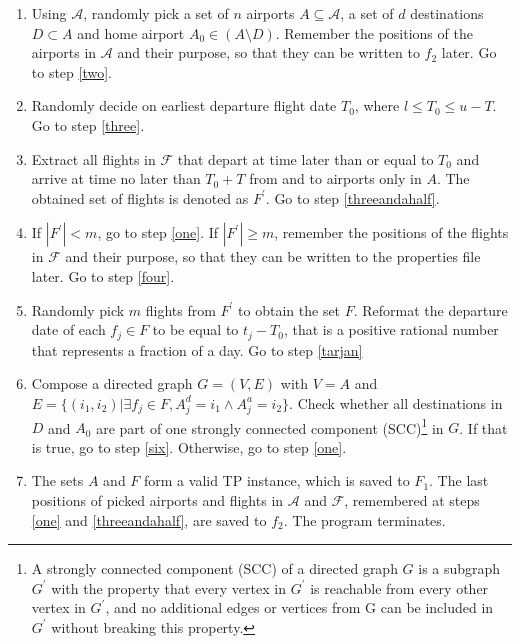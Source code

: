 \documentclass{mpaper}
\begin{document}
\begin{enumerate}[topsep=0.1em]
\setlength\itemsep{0.1em}
\item \label{one} Using $\mathcal{A}$, randomly pick a set of $n$ airports $A \subseteq \mathcal{A}$, a set of $d$ destinations $D \subset A$ and home airport $A_0 \in (A \setminus D)$. Remember the positions of the airports in $\mathcal{A}$ and their purpose, so that they can be written to $f_2$ later. Go to step \ref{two}.

\item \label{two} Randomly decide on earliest departure flight date $T_0$, where $l \leq T_0 \leq u - T$. Go to step \ref{three}.

\item \label{three} Extract all flights in $\mathcal{F}$ that depart at time later than or equal to $T_0$ and arrive at time no later than $T_0 + T$ from and to airports only in $A$. The obtained set of flights is denoted as $F^\prime$. Go to step \ref{threeandahalf}.

\item \label{threeandahalf} If $|F^\prime| < m$, go to step \ref{one}. If $|F^\prime| \geq m$, remember the positions of the flights in $\mathcal{F}$ and their purpose, so that they can be written to the properties file later. Go to step \ref{four}.

\item \label{four} Randomly pick $m$ flights from $F^\prime$ to obtain the set $F$. Reformat the departure date of each $f_j \in F$ to be equal to $t_j - T_0$, that is a positive rational number that represents a fraction of a day. Go to step \ref{tarjan}

\item \label{tarjan} Compose a directed graph $G=(V, E)$ with $V = A$ and $E = \{(i_1, i_2) | \exists f_j \in F, A^d_j = i_1 \wedge A^a_j = i_2 \}$. Check whether all destinations in $D$ and $A_0$ are part of one strongly connected component (SCC)\footnote{A strongly connected component (SCC) of a directed graph $G$ is a subgraph $G^\prime$ with the property that every vertex in $G^\prime$ is reachable from every other vertex in $G^\prime$, and no additional edges or vertices from G can be included in $G^\prime$ without breaking this property.} in $G$. If that is true, go to step \ref{six}. Otherwise, go to step \ref{one}.

\item \label{six} The sets $A$ and $F$ form a valid TP instance, which is saved to $F_1$. The last positions of picked airports and flights in $\mathcal{A}$ and $\mathcal{F}$, remembered at steps \ref{one} and \ref{threeandahalf}, are saved to $f_2$. The program terminates.
\end{enumerate}
\end{document}
